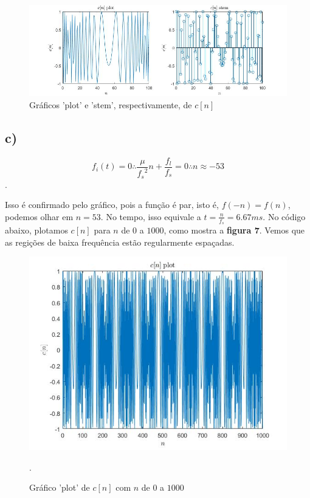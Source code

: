 \documentclass[a4paper, 12pt]{article}
\begin{document}
\begin{figure}[H]
	\centering
	\includegraphics[scale=0.6]{../Imagens/ex2/b.jpg} 
	\caption{Gráficos 'plot' e 'stem', respectivamente, de $c[n]$}
	\label{fig:2b}
\end{figure}

\subsection{c)}

$$f_i(t) = 0 \therefore \frac{\mu}{{f_s}^2}n + \frac{f_l}{f_s} = 0 \therefore n\approx -53$$.

Isso é confirmado pelo gráfico, pois a função é par, isto é, $f(-n)=f(n)$, podemos olhar em $n=53$. No tempo, isso equivale a $t=\frac{n}{f_s}=6.67ms$. No código abaixo, plotamos $c[n]$ para $n$ de $0$ a $1000$, como mostra a \textbf{figura 7}. Vemos que as regições de baixa frequência estão regularmente espaçadas.



\begin{figure}[H]
	\centering
	\includegraphics[scale=0.6]{../Imagens/ex2/c.jpg} 
	\caption{Gráfico 'plot' de $c[n]$ com $n$ de $0$ a $1000$}.
	\label{fig:2c}
\end{figure}
\end{document}
